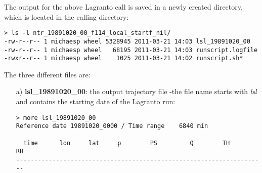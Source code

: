 \documentclass[a4paper,10pt]{article}
\begin{document}
\noindent
The output for the above Lagranto call is saved in a newly created directory, which is located in the calling directory:
\begin{verbatim}
> ls -l ntr_19891020_00_f114_local_startf_nil/
-rw-r--r-- 1 michaesp wheel 5328945 2011-03-21 14:03 lsl_19891020_00
-rw-r--r-- 1 michaesp wheel   68195 2011-03-21 14:03 runscript.logfile
-rwxr--r-- 1 michaesp wheel    1025 2011-03-21 14:02 runscript.sh*
\end{verbatim}
The three different files are:
\begin{itemize}
\item[a)]  {\bf lsl\_19891020\_00}: the output trajectory file -the file name starts with {\em lsl} and contains the starting date of the Lagranto run:
\begin{verbatim}
> more lsl_19891020_00
Reference date 19891020_0000 / Time range    6840 min

  time      lon     lat     p        PS         Q        TH        RH
---------------------------------------------------------------------


\end{verbatim}
\end{itemize}
\end{document}
